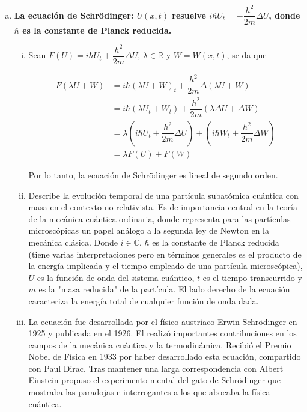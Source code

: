 \documentclass[fleqn]{article}
\newcommand{\real}{\mathbb{R}}
\newcommand{\complex}{\mathbb{C}}
\begin{document}
	\begin{enumerate}[(a)]
		\item \textbf{La ecuación de Schr\"odinger: $ U(x,t) $ resuelve $ i \hbar U_t = - \dfrac{h^2}{2m} \Delta U $, donde $ \hbar $ es la constante de Planck reducida.}
		
		\begin{enumerate}[(i)]
			\item Sean $ F(U) = i \hbar U_t + \dfrac{h^2}{2m} \Delta U $, $ \lambda \in \real $ y $ W = W(x,t) $, se da que
			
			\begin{align*}
				F(\lambda U + W) &= i \hbar \left( \lambda U + W \right)_t + \dfrac{h^2}{2m} \Delta \left( \lambda U + W \right) \\
				&= i \hbar \left( \lambda U_t + W_t \right) + \dfrac{h^2}{2m} \left( \lambda \Delta U + \Delta W \right) \\
				&= \lambda \left( i \hbar U_t + \dfrac{h^2}{2m} \Delta U \right) + \left( i \hbar W_t + \dfrac{h^2}{2m} \Delta W \right) \\
				&= \lambda F(U) + F(W)
			\end{align*}

			Por lo tanto, la ecuación de Schr\"odinger es lineal de segundo orden.

			\item Describe la evolución temporal de una partícula subatómica cuántica con masa en el contexto no relativista. Es de importancia central en la teoría de la mecánica cuántica ordinaria, donde representa para las partículas microscópicas un papel análogo a la segunda ley de Newton en la mecánica clásica. Donde $ i \in \complex $, $ \hbar $ es la constante de Planck reducida (tiene varias interpretaciones pero en términos generales es el producto de la energía implicada y el tiempo empleado de una partícula microscópica), $ U $ es la función de onda del sistema cuántico, $ t $ es el tiempo transcurrido y $ m $ es la "masa reducida" de la partícula. El lado derecho de la ecuación caracteriza la energía total de cualquier función de onda dada.
			
			\item La ecuación fue desarrollada por el físico austríaco Erwin Schrödinger en 1925 y publicada en el 1926. El realizó importantes contribuciones en los campos de la mecánica cuántica y la termodinámica. Recibió el Premio Nobel de Física en 1933 por haber desarrollado esta ecuación, compartido con Paul Dirac. Tras mantener una larga correspondencia con Albert Einstein propuso el experimento mental del gato de Schrödinger que mostraba las paradojas e interrogantes a los que abocaba la física cuántica.
		\end{enumerate}


\end{enumerate}
\end{document}

